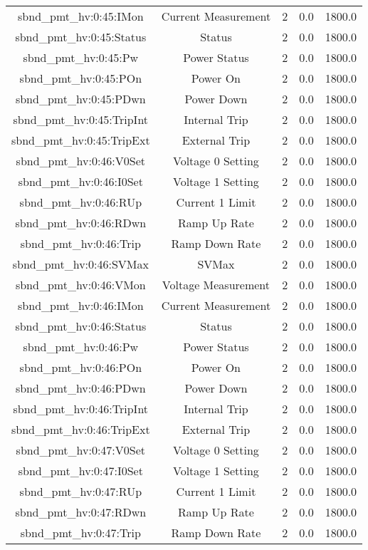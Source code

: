 \begin{table}[ptb]
\begin{tabular}{c | c c c c}
sbnd_pmt_hv:0:45:IMon & Current Measurement & 2 & 0.0 & 1800.0\\ 
sbnd_pmt_hv:0:45:Status & Status & 2 & 0.0 & 1800.0\\ 
sbnd_pmt_hv:0:45:Pw & Power Status & 2 & 0.0 & 1800.0\\ 
sbnd_pmt_hv:0:45:POn & Power On & 2 & 0.0 & 1800.0\\ 
sbnd_pmt_hv:0:45:PDwn & Power Down & 2 & 0.0 & 1800.0\\ 
sbnd_pmt_hv:0:45:TripInt & Internal Trip & 2 & 0.0 & 1800.0\\ 
sbnd_pmt_hv:0:45:TripExt & External Trip & 2 & 0.0 & 1800.0\\ 
sbnd_pmt_hv:0:46:V0Set & Voltage 0 Setting & 2 & 0.0 & 1800.0\\ 
sbnd_pmt_hv:0:46:I0Set & Voltage 1 Setting & 2 & 0.0 & 1800.0\\ 
sbnd_pmt_hv:0:46:RUp & Current 1 Limit & 2 & 0.0 & 1800.0\\ 
sbnd_pmt_hv:0:46:RDwn & Ramp Up Rate & 2 & 0.0 & 1800.0\\ 
sbnd_pmt_hv:0:46:Trip & Ramp Down Rate & 2 & 0.0 & 1800.0\\ 
sbnd_pmt_hv:0:46:SVMax & SVMax & 2 & 0.0 & 1800.0\\ 
sbnd_pmt_hv:0:46:VMon & Voltage Measurement & 2 & 0.0 & 1800.0\\ 
sbnd_pmt_hv:0:46:IMon & Current Measurement & 2 & 0.0 & 1800.0\\ 
sbnd_pmt_hv:0:46:Status & Status & 2 & 0.0 & 1800.0\\ 
sbnd_pmt_hv:0:46:Pw & Power Status & 2 & 0.0 & 1800.0\\ 
sbnd_pmt_hv:0:46:POn & Power On & 2 & 0.0 & 1800.0\\ 
sbnd_pmt_hv:0:46:PDwn & Power Down & 2 & 0.0 & 1800.0\\ 
sbnd_pmt_hv:0:46:TripInt & Internal Trip & 2 & 0.0 & 1800.0\\ 
sbnd_pmt_hv:0:46:TripExt & External Trip & 2 & 0.0 & 1800.0\\ 
sbnd_pmt_hv:0:47:V0Set & Voltage 0 Setting & 2 & 0.0 & 1800.0\\ 
sbnd_pmt_hv:0:47:I0Set & Voltage 1 Setting & 2 & 0.0 & 1800.0\\ 
sbnd_pmt_hv:0:47:RUp & Current 1 Limit & 2 & 0.0 & 1800.0\\ 
sbnd_pmt_hv:0:47:RDwn & Ramp Up Rate & 2 & 0.0 & 1800.0\\ 
sbnd_pmt_hv:0:47:Trip & Ramp Down Rate & 2 & 0.0 & 1800.0\\ 

\end{tabular}
\end{table}
